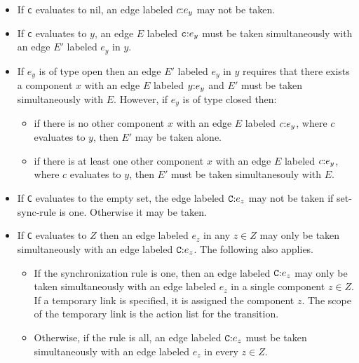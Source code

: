 \begin{itemize}

\def\ee#1#2{$#1\hbox{:}#2$}


\item If {\tt c} evaluates to {\tok nil}, an edge labeled
\ee{c}{e_y} may not be taken.

\item If {\tt c} evaluates to $y$, an edge $E$ labeled \ee{{\tt c}}{e_y}
must be taken simultaneously with an edge $E'$ labeled $e_y$ in
$y$.

\item If $e_y$ is of type {\tok open} then an edge $E'$ labeled $e_y$
in $y$ requires that there exists a component $x$ with an edge $E$
labeled \ee{y}{e_y} and $E'$ must be taken simultaneously with $E$.
However, if $e_y$ is of type {\tok closed} then:

\begin{itemize}

\item if there is no other component $x$ with an edge $E$ labeled
\ee{c}{e_y}, where $c$ evaluates to $y$, then $E'$
may be taken alone.

\item if there is at least one other component $x$ with an edge $E$
labeled \ee{c}{e_y}, where $c$ evaluates to $y$, then $E'$ must be
taken simultanesouly with $E$.

\end{itemize}

\item If {\tt C} evaluates to the empty set, the edge labeled
\ee{{\tt C}}{e_z} may not be taken if {\nont set-sync-rule} is {\tok one}.
Otherwise it may be taken.

\item If {\tt C} evaluates to $Z$ then
an edge labeled $e_z$ in any $z \in Z$ may only be taken
simultaneously with an edge labeled \ee{{\tok C}}{e_z}.  The following
also applies.

\begin{itemize}

\item If the synchronization rule is {\tok one}, then an edge labeled
\ee{{\tt C}}{e_z} may only be taken simultaneously with an edge
labeled $e_z$ in a single component $z \in Z$.  If a temporary link is
specified, it is assigned the component $z$.  The scope of the
temporary link is the action list for the transition.

\item Otherwise, if the rule is {\tok all}, an edge labeled \ee{{\tt
C}}{e_z} must be taken simultaneously with an edge labeled $e_z$ in
every $z \in Z$.

\end{itemize}

\end{itemize}


